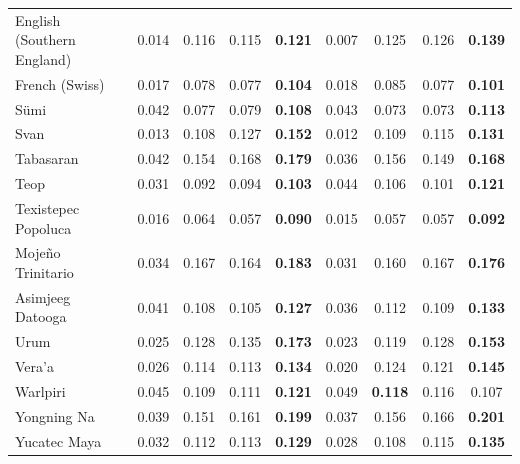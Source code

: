 \begin{longtable}{lcccccccc}
English (Southern England) & 0.014 & 0.116 & 0.115 & \textbf{0.121} & 0.007 & 0.125 & 0.126 & \textbf{0.139} \\
French (Swiss) & 0.017 & 0.078 & 0.077 & \textbf{0.104} & 0.018 & 0.085 & 0.077 & \textbf{0.101} \\
Sümi & 0.042 & 0.077 & 0.079 & \textbf{0.108} & 0.043 & 0.073 & 0.073 & \textbf{0.113} \\
Svan & 0.013 & 0.108 & 0.127 & \textbf{0.152} & 0.012 & 0.109 & 0.115 & \textbf{0.131} \\
Tabasaran & 0.042 & 0.154 & 0.168 & \textbf{0.179} & 0.036 & 0.156 & 0.149 & \textbf{0.168} \\
Teop & 0.031 & 0.092 & 0.094 & \textbf{0.103} & 0.044 & 0.106 & 0.101 & \textbf{0.121} \\
Texistepec Popoluca & 0.016 & 0.064 & 0.057 & \textbf{0.090} & 0.015 & 0.057 & 0.057 & \textbf{0.092} \\
Mojeño Trinitario & 0.034 & 0.167 & 0.164 & \textbf{0.183} & 0.031 & 0.160 & 0.167 & \textbf{0.176} \\
Asimjeeg Datooga & 0.041 & 0.108 & 0.105 & \textbf{0.127} & 0.036 & 0.112 & 0.109 & \textbf{0.133} \\
Urum & 0.025 & 0.128 & 0.135 & \textbf{0.173} & 0.023 & 0.119 & 0.128 & \textbf{0.153} \\
Vera'a & 0.026 & 0.114 & 0.113 & \textbf{0.134} & 0.020 & 0.124 & 0.121 & \textbf{0.145} \\
Warlpiri & 0.045 & 0.109 & 0.111 & \textbf{0.121} & 0.049 & \textbf{0.118} & 0.116 & 0.107 \\
Yongning Na & 0.039 & 0.151 & 0.161 & \textbf{0.199} & 0.037 & 0.156 & 0.166 & \textbf{0.201} \\
Yucatec Maya & 0.032 & 0.112 & 0.113 & \textbf{0.129} & 0.028 & 0.108 & 0.115 & \textbf{0.135} \\
\end{longtable}
\endgroup